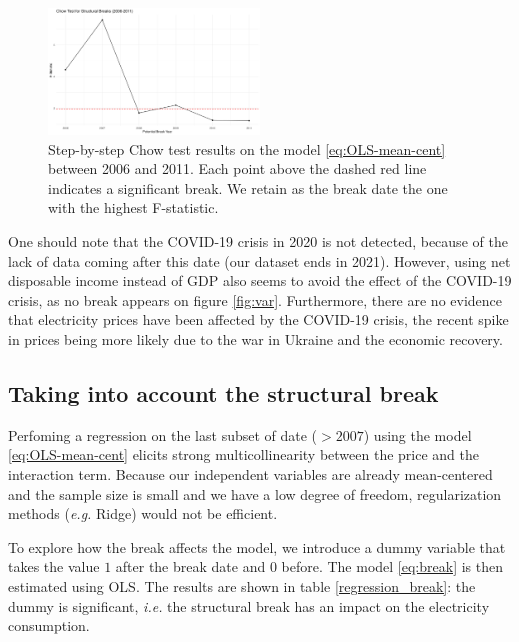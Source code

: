 \begin{figure}[h]
    \centering
      \includegraphics[width=0.5\textwidth]{Images/chow_test_results.jpeg}
      \caption{Step-by-step Chow test results on the model \ref{eq:OLS-mean-cent} between 2006 and 2011. Each point above the dashed red line indicates a significant break. We retain as the break date the one with the highest F-statistic.}
    \label{fig:chow-break}
\end{figure}

One should note that the COVID-19 crisis in 2020 is not detected, because of the lack of data coming after this date (our dataset ends in 2021). However, using net disposable income instead of GDP also seems to avoid the effect of the COVID-19 crisis, as no break appears on figure \ref{fig:var}. Furthermore, there are no evidence that electricity prices have been affected by the COVID-19 crisis, the recent spike in prices being more likely due to the war in Ukraine and the economic recovery.

\subsection{Taking into account the structural break}
Perfoming a regression on the last subset of date ($> 2007$) using the model \eqref{eq:OLS-mean-cent} elicits strong multicollinearity between the price and the interaction term. Because our independent variables are already mean-centered and the sample size is small and we have a low degree of freedom, regularization methods (\textit{e.g.} Ridge) would not be efficient.

To explore how the break affects the model, we introduce a dummy variable that takes the value $1$ after the break date and $0$ before. The model \eqref{eq:break} is then estimated using OLS. The results are shown in table \ref{regression_break}: the dummy is significant, \textit{i.e.} the structural break has an impact on the electricity consumption. 

